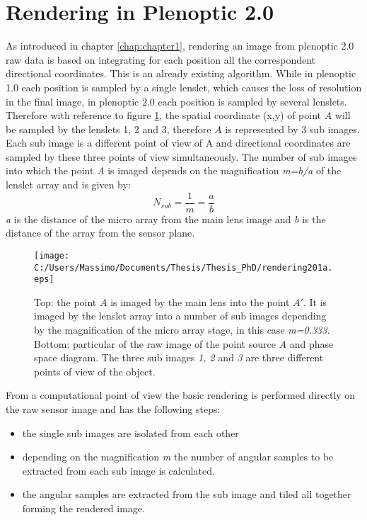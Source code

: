\section{Rendering in Plenoptic 2.0}
\label{sec:rendering}
As introduced in chapter \ref{chap:chapter1}, rendering an image from plenoptic 2.0  raw data is based on integrating for each position all the correspondent directional coordinates. This is an already existing algorithm. While in plenoptic 1.0 each position is sampled by a single lenslet, which causes the loss of resolution in the final image, in plenoptic 2.0 each position is sampled by several lenslets. Therefore with reference to figure \ref{fig:render202}, the spatial coordinate (x,y) of point $A$ will be sampled by the lenslets 1, 2 and 3, therefore $A$ is represented by 3 sub images. Each sub image is a different point of view of A and directional coordinates are sampled by these three points of view simultaneously. The number of sub images into which the point \textit{A} is imaged depends on the magnification \textit{m=b/a} of the lenslet array and is given by:
\begin{equation}
\label{eq:point_of_view}
N_{sub} = \dfrac{1}{m}=\dfrac{a}{b}
\end{equation}
 \textit{a} is the distance of the micro array from the main lens image and \textit{b} is the distance of the array from the sensor plane. 
\begin{figure}[H]
	\centering
	\texttt{[image: C:/Users/Massimo/Documents/Thesis/Thesis\_PhD/rendering201a.eps]}
	\caption{\label{fig:render202} Top: the point $A$ is imaged by the main lens into the point $A'$. It is imaged by the lenslet array into a number of sub images depending by the magnification of the micro array stage, in this case \textit{m=0.333}. Bottom: particular of the raw image of the point source $A$ and phase space diagram. The three sub images \textit{1, 2} and \textit{3} are three different points of view of the object.  }
\end{figure}
From a computational point of view the basic rendering is performed directly on the raw sensor image and has the following steps:
\begin{itemize}
	\item the single sub images are isolated from each other 
	\item depending on the magnification \textit{m} the number of angular samples to be extracted from each sub image is calculated.
	\item the angular samples are extracted from the sub image and tiled all together forming the rendered image.
\end{itemize}
